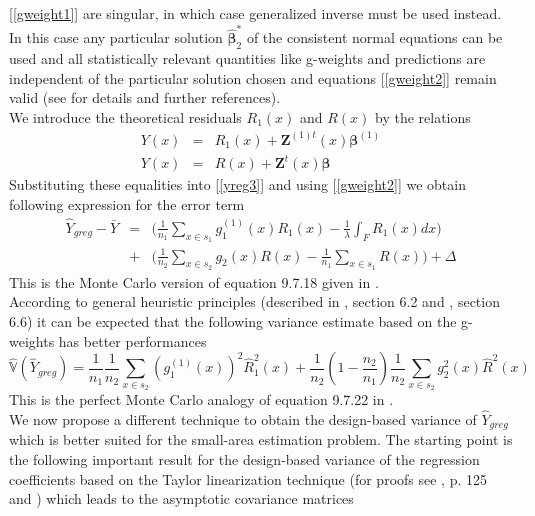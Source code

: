 \documentclass[a4paper,12pt,leqno, titlepage]{article}
\newcommand{\VAR}{\mathbb{V}}
\begin{document}
[{\ref{gweight1}] are singular, in which case generalized inverse must be used instead. In this case any particular solution $\hat{\pmb{\beta}}_2^*$ of the consistent normal equations can be used and all statistically relevant quantities like g-weights and predictions are independent of the particular solution chosen and equations [\ref{gweight2}] remain valid (see \cite{Renssen} for details and further references). \\
We introduce the theoretical residuals $R_1(x)$ and $R(x)$ by the relations
\begin{eqnarray}\label{theorres}
Y(x)&=& R_1(x)+\pmb{Z}^{(1)t}(x)\pmb{\beta}^{(1)} \nonumber \\
Y(x) &=& R(x)+\pmb{Z}^t(x)\pmb{\beta}
\end{eqnarray}
Substituting these equalities into [\ref{yreg3}] and using [\ref{gweight2}] we obtain
following expression for the error term
\begin{eqnarray}\label{error1}
\hat{Y}_{greg}-\bar{Y} &=&\Big(\frac{1}{n_1}\sum_{x\in{s_1}}g_1^{(1)}(x)R_1(x)-\frac{1}{\lambda}\int_F R_1(x)dx\Big) \nonumber \\
&+& \Big(\frac{1}{n_2}\sum_{x\in{s_2}}g_2(x)R(x)-\frac{1}{n_1}\sum_{x\in{s_1}}R(x)\Big)+ \Delta
\end{eqnarray}
 This is the Monte Carlo version of equation 9.7.18 given in \cite{sarndal}.\\
According to general heuristic principles (described in \cite{mandallaz}, section 6.2 and \cite{sarndal}, section 6.6) it can be expected that the following variance estimate based on the g-weights has better performances
\begin{equation}\label{estavar2}
\hat{\VAR}(\hat{Y}_{greg})=\frac{1}{n_1}\frac{1}{n_2}\sum_{x\in{s}_2}(g_1^{(1)}(x))^2\hat{R}_1^2(x)+
\frac{1}{n_2}(1-\frac{n_2}{n_1})\frac{1}{n_2}\sum_{x\in{s}_2}g_2^2(x)\hat{R}^2(x)
\end{equation}
This is the perfect Monte Carlo analogy of equation 9.7.22 in \cite{sarndal}.\\
We now propose a different technique to obtain the design-based variance of $\hat{Y}_{greg}$ which is better suited for the small-area estimation problem. The starting point is the following important result for the design-based variance of the regression coefficients based on the Taylor linearization technique (for proofs see \cite{mandallaz}, p. 125 and \cite{mandallazreport1}) which leads to the asymptotic covariance matrices
\begin{equation}\label{lemma1}

\end{equation}}
\end{document}
